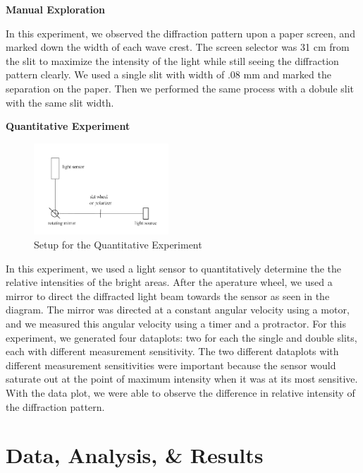 \documentclass{article}[12pt]
\begin{document}
\textbf{Manual Exploration}

In this experiment, we observed the diffraction pattern upon a paper screen, and marked down the width of each wave crest.
The screen selector was 31 cm from the slit to maximize the intensity of the light while still seeing the diffraction pattern clearly. 
We used a single slit with width of .08 mm and marked the separation on the paper. 
Then we performed the same process with a dobule slit with the same slit width. 

\textbf{Quantitative Experiment}

\begin{figure}
  \center
  \includegraphics[width=0.45\textwidth]{figures/quant_exp.png}
  \caption{Setup for the Quantitative Experiment}
\end{figure}

In this experiment, we used a light sensor to quantitatively determine the the relative intensities of the bright areas.
After the aperature wheel, we used a mirror to direct the diffracted light beam towards the sensor as seen in the diagram.
The mirror was directed at a constant angular velocity using a motor, and we measured this angular velocity using a timer and a protractor.
For this experiment, we generated four dataplots: two for each the single and double slits, each with different measurement sensitivity.
The two different dataplots with different measurement sensitivities were important because the sensor would saturate out at the point of maximum intensity when it was at its most sensitive.
With the data plot, we were able to observe the difference in relative intensity of the diffraction pattern. 

\section{Data, Analysis, \& Results}
\end{document}
